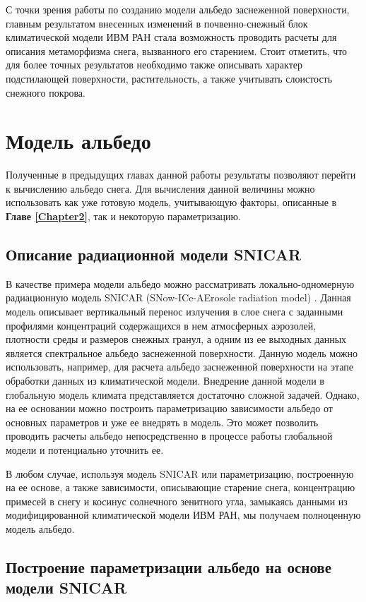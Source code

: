 \documentclass[a4paper, fontsize=14pt]{scrartcl}
\begin{document}
С точки зрения работы по созданию модели альбедо заснеженной поверхности, главным результатом внесенных изменений в почвенно-снежный блок климатической модели ИВМ РАН стала возможность проводить расчеты для описания метаморфизма снега, вызванного его старением. Стоит отметить, что для более точных результатов необходимо также описывать характер подстилающей поверхности, растительность, а также учитывать слоистость снежного покрова.



\newpage
\section{Модель альбедо}

Полученные в предыдущих главах данной работы результаты позволяют перейти к вычислению альбедо снега. Для вычисления данной величины можно использовать как уже готовую модель, учитывающую факторы, описанные в \textbf{Главе \ref{Chapter2}}, так и некоторую параметризацию. 

\subsection{Описание радиационной модели SNICAR}
В качестве примера модели альбедо можно рассматривать локально-одномерную радиационную модель SNICAR (SNow-ICe-AErosole radiation model) \cite{Flanner2007}. Данная модель описывает вертикальный перенос излучения в слое снега с заданными профилями концентраций содержащихся в нем атмосферных аэрозолей, плотности среды и размеров снежных гранул, а одним из ее выходных данных является спектральное альбедо заснеженной поверхности. Данную модель можно использовать, например, для расчета альбедо заснеженной поверхности на этапе обработки данных из климатической модели. Внедрение данной модели в глобальную модель климата представляется достаточно сложной задачей. Однако, на ее основании можно построить параметризацию зависимости альбедо от основных параметров и уже ее внедрять в модель. Это может позволить проводить расчеты альбедо непосредственно в процессе работы глобальной модели и потенциально уточнить ее.

В любом случае, используя модель SNICAR или параметризацию, построенную на ее основе, а также зависимости, описывающие старение снега, концентрацию примесей в снегу и косинус солнечного зенитного угла, замыкаясь данными из модифицированной климатической модели ИВМ РАН, мы получаем полноценную модель альбедо.

\subsection{Построение параметризации альбедо на основе модели SNICAR}
\end{document}

